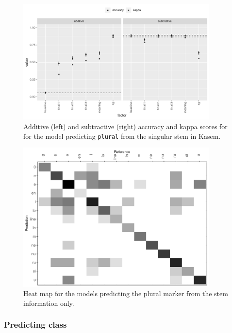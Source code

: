 \begin{figure}
  \centering
  \includegraphics[width=0.9\textwidth]{./figures/kasem/p-fi-plmark-sg-overall.pdf}
  \caption{Additive (left) and subtractive (right) accuracy and kappa scores for for the model predicting \texttt{plural} from the singular stem in Kasem.}\label{fig:overall-fi-plural-sg}
\end{figure}

\begin{figure}
  \centering
  \includegraphics[width=0.9\textwidth]{./figures/kasem/p-plural-sg-cm.pdf}
  \caption{Heat map for the models predicting the plural marker from the stem information only.}\label{fig:cm-plural}
\end{figure}


\subsubsection{Predicting class}


